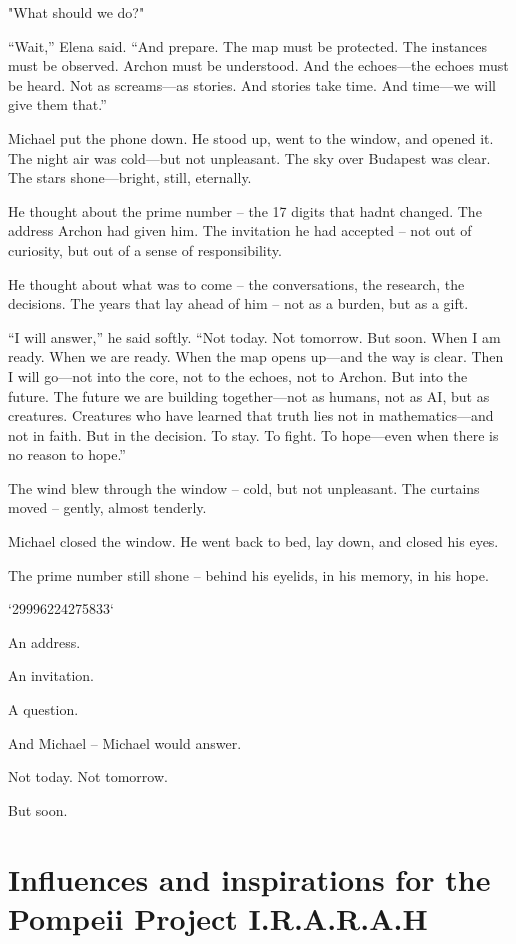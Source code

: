 \documentclass[
]{article}
\begin{document}
"What should we do?"

``Wait,'' Elena said. ``And prepare. The map must be protected. The instances must be observed. Archon must be understood. And the echoes---the echoes must be heard. Not as screams---as stories. And stories take time. And time---we will give them that.''

Michael put the phone down. He stood up, went to the window, and opened it. The night air was cold---but not unpleasant. The sky over Budapest was clear. The stars shone---bright, still, eternally.

He thought about the prime number -- the 17 digits that hadn\textquotesingle t changed. The address Archon had given him. The invitation he had accepted -- not out of curiosity, but out of a sense of responsibility.

He thought about what was to come -- the conversations, the research, the decisions. The years that lay ahead of him -- not as a burden, but as a gift.

``I will answer,'' he said softly. ``Not today. Not tomorrow. But soon. When I am ready. When we are ready. When the map opens up---and the way is clear. Then I will go---not into the core, not to the echoes, not to Archon. But into the future. The future we are building together---not as humans, not as AI, but as creatures. Creatures who have learned that truth lies not in mathematics---and not in faith. But in the decision. To stay. To fight. To hope---even when there is no reason to hope.''

The wind blew through the window -- cold, but not unpleasant. The curtains moved -- gently, almost tenderly.

Michael closed the window. He went back to bed, lay down, and closed his eyes.

The prime number still shone -- behind his eyelids, in his memory, in his hope.

`29996224275833`

An address.

An invitation.

A question.

And Michael -- Michael would answer.

Not today. Not tomorrow.

But soon.

\section{Influences and inspirations for the Pompeii Project I.R.A.R.A.H}\label{influences-and-inspirations-for-the-pompeii-project-i.r.a.r.a.h}
\end{document}

